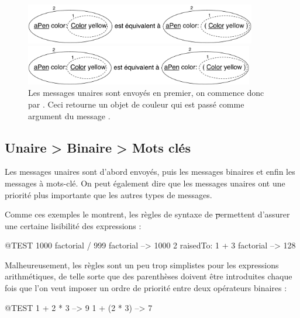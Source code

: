 \documentclass[a4paper,10pt,twoside]{book}
\begin{document}
\begin{figure}[ht]
\ifluluelse
	{\centerline{\includegraphics[width=0.9\textwidth]{uKeyUn}} }
	{\centerline{\includegraphics[width=10cm]{uKeyUn}} }
\caption{Les messages unaires sont envoy\'es en premier, on commence donc par . Ceci retourne un objet de couleur qui est pass\'e comme argument du message .\label{fig:uKeyUn}}
\end{figure}

\subsection*{Unaire > Binaire > Mots cl\'es}
Les messages unaires sont d'abord envoy\'es, puis les messages binaires et enfin les messages \`a mots-cl\'e. On peut \'egalement dire que les messages unaires ont une priorit\'e plus importante que les autres types de messages.


Comme ces exemples le montrent, les r\`egles de syntaxe de \st permettent d'assurer une certaine lisibilit\'e des expressions :
\begin{code}{@TEST}
1000 factorial / 999 factorial --> 1000
2 raisedTo: 1 + 3 factorial     --> 128
\end{code}
\noindent

Malheureusement, les r\`egles sont un peu trop simplistes pour les expressions arithm\'etiques, de telle sorte que des parenth\`eses doivent \^etre introduites chaque fois que l'on veut imposer un ordre de priorit\'e entre deux op\'erateurs binaires :
\begin{code}{@TEST}
1 + 2 * 3   --> 9
1 + (2 * 3) --> 7
\end{code}
\end{document}
